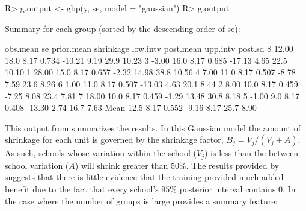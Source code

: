 \documentclass[article]{jss}
\begin{document}
\begin{CodeChunk}
\begin{CodeInput}
R> g.output <- gbp(y, se, model = "gaussian")
R> g.output
\end{CodeInput}
\begin{CodeOutput}
Summary for each group (sorted by the descending order of se): 

     obs.mean   se prior.mean shrinkage low.intv post.mean upp.intv post.sd
8       12.00 18.0       8.17     0.734   -10.21      9.19     29.9   10.23
3       -3.00 16.0       8.17     0.685   -17.13      4.65     22.5   10.10
1       28.00 15.0       8.17     0.657    -2.32     14.98     38.8   10.56
4        7.00 11.0       8.17     0.507    -8.78      7.59     23.6    8.26
6        1.00 11.0       8.17     0.507   -13.03      4.63     20.1    8.44
2        8.00 10.0       8.17     0.459    -7.25      8.08     23.4    7.81
7       18.00 10.0       8.17     0.459    -1.29     13.48     30.8    8.18
5       -1.00  9.0       8.17     0.408   -13.30      2.74     16.7    7.63
Mean          12.5       8.17     0.552    -9.16      8.17     25.7    8.90
\end{CodeOutput}
\end{CodeChunk}
This output from  summarizes the results. In this Gaussian  model the amount of shrinkage for each unit is governed by the shrinkage factor, $B_j = V_j/(V_j + A)$. As such, schools whose variation within the school ($V_{j}$) is less than the between school variation ($A$) will shrink greater than $50\%$. The results provided by  suggests that there is little evidence that the training provided much added benefit due to the fact that every school's $95\%$ posterior interval contains 0. In the case where the number of groups is large  provides a summary feature:
\end{document}
